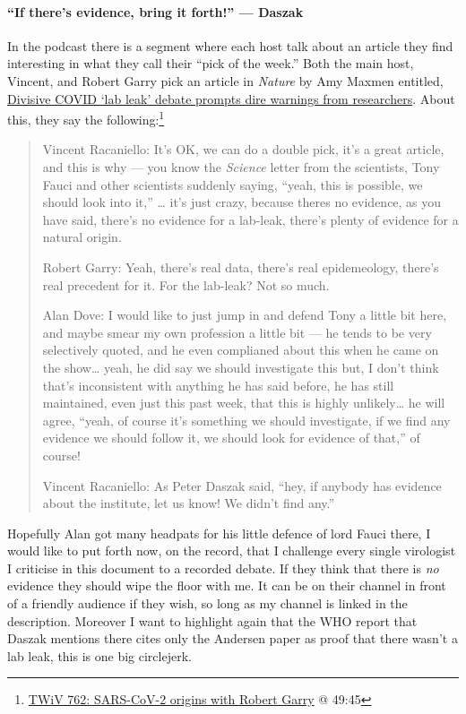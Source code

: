 \documentclass[11pt]{article}
\begin{document}
\paragraph{``If there's evidence, bring it forth!'' --- Daszak}
\label{sec:orgccdacf9}
In the podcast there is a segment where each host talk about an article they find interesting in what they call their ``pick of the week.'' Both the main host, Vincent, and Robert Garry pick an article in \emph{Nature} by Amy Maxmen entitled, \href{https://www.nature.com/articles/d41586-021-01383-3}{Divisive COVID ‘lab leak’ debate prompts dire warnings from researchers}. About this, they say the following:\footnote{\href{https://youtu.be/IxwrDSYrhjU?t=2985}{TWiV 762: SARS-CoV-2 origins with Robert Garry} @ 49:45}
\begin{quote}
Vincent Racaniello: It's OK, we can do a double pick, it's a great article, and this is why --- you know the \emph{Science} letter from the scientists, Tony Fauci and other scientists suddenly saying, ``yeah, this is possible, we should look into it,'' \ldots{} it's just crazy, because theres no evidence, as you have said, there's no evidence for a lab-leak, there's plenty of evidence for a natural origin.

Robert Garry: Yeah, there's real data, there's real epidemeology, there's real precedent for it. For the lab-leak? Not so much.

Alan Dove: I would like to just jump in and defend Tony a little bit here, and maybe smear my own profession a little bit --- he tends to be very selectively quoted, and he even complianed about this when he came on the show\ldots{} yeah, he did say we should investigate this but, I don't think that's inconsistent with anything he has said before, he has still maintained, even just this past week, that this is highly unlikely\ldots{} he will agree, ``yeah, of course it's something we should investigate, if we find any evidence we should follow it, we should look for evidence of that,'' of course!

Vincent Racaniello: As Peter Daszak said, ``hey, if anybody has evidence about the institute, let us know! We didn't find any.''
\end{quote}
Hopefully Alan got many headpats for his little defence of lord Fauci there, I would like to put forth now, on the record, that I challenge every single virologist I criticise in this document to a recorded debate. If they think that there is \emph{no} evidence they should wipe the floor with me. It can be on their channel in front of a friendly audience if they wish, so long as my channel is linked in the description. Moreover I want to highlight again that the WHO report that Daszak mentions there cites only the Andersen paper as proof that there wasn't a lab leak, this is one big circlejerk.
\end{document}

